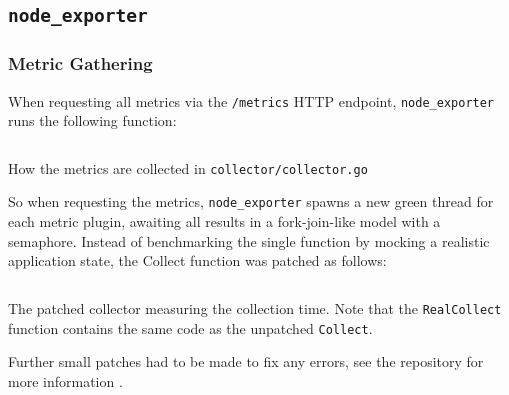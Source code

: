 \subsection{\texttt{node\_exporter}}
\subsubsection{Metric Gathering}

When requesting all metrics via the \texttt{/metrics} HTTP endpoint, \texttt{node\_exporter} runs the following
function:

\begin{listing}[H]
  \inputminted{go}{./gather.go}
  \caption{How the metrics are collected in \texttt{collector/collector.go}}
\end{listing}

So when requesting the metrics, \texttt{node\_exporter} spawns a new green thread for each metric plugin, 
awaiting all results in a fork-join-like model with a semaphore. Instead of benchmarking the single function
by mocking a realistic application state, the Collect function was patched as follows:

\begin{listing}[H]
  \inputminted{go}{./gather_patched.go}
  \caption{The patched collector measuring the collection time. Note that the \texttt{RealCollect} function contains the same code as the unpatched \texttt{Collect}.}
\end{listing}

Further small patches had to be made to fix any errors, see the repository for more information \cite{my_node_exporter}.

